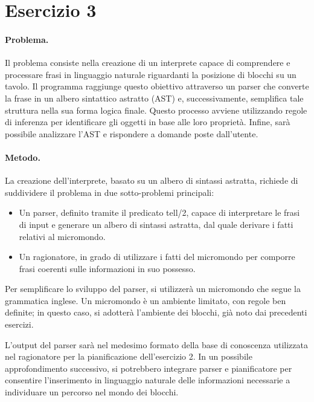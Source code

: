 \documentclass[12pt,twoside]{report}
\begin{document}

\cleardoublepage

\section*{Esercizio 3}

\paragraph{Problema.} Il problema consiste nella creazione di un interprete capace di comprendere e processare frasi in linguaggio naturale riguardanti la posizione di blocchi su un tavolo. Il programma raggiunge questo obiettivo attraverso un parser che converte la frase in un albero sintattico astratto (AST) e, successivamente, semplifica tale struttura nella sua forma logica finale. Questo processo avviene utilizzando regole di inferenza per identificare gli oggetti in base alle loro proprietà. Infine, sarà possibile analizzare l'AST e rispondere a domande poste dall'utente.

\paragraph{Metodo.} La creazione dell'interprete, basato su un albero di sintassi astratta, richiede di suddividere il problema in due sotto-problemi principali: \begin{itemize} 
\item Un parser, definito tramite il predicato tell/2, capace di interpretare le frasi di input e generare un albero di sintassi astratta, dal quale derivare i fatti relativi al micromondo. 
\item Un ragionatore, in grado di utilizzare i fatti del micromondo per comporre frasi coerenti sulle informazioni in suo possesso. 
\end{itemize}

Per semplificare lo sviluppo del parser, si utilizzerà un micromondo che segue la grammatica inglese. Un micromondo è un ambiente limitato, con regole ben definite; in questo caso, si adotterà l’ambiente dei blocchi, già noto dai precedenti esercizi.

L'output del parser sarà nel medesimo formato della base di conoscenza utilizzata nel ragionatore per la pianificazione dell'esercizio 2. In un possibile approfondimento successivo, si potrebbero integrare parser e pianificatore per consentire l'inserimento in linguaggio naturale delle informazioni necessarie a individuare un percorso nel mondo dei blocchi.
\end{document}
